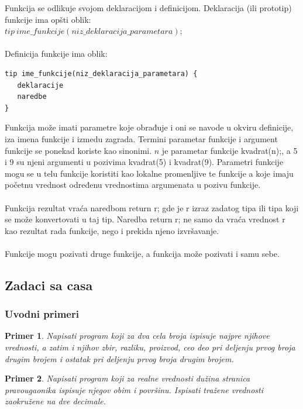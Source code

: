 \documentclass[a4paper]{article}
\newtheorem{primer}{Primer}[section]
\begin{document}
Funkcija se odlikuje svojom deklaracijom i definicijom.
Deklaracija (ili prototip) funkcije ima opšti oblik:\\
$tip\ ime\_funkcije(niz\_deklaracija\_parametara);$\\\\
Definicija funkcije ima oblik:
\begin{verbatim}
tip ime_funkcije(niz_deklaracija_parametara) {
   deklaracije
   naredbe
}
\end{verbatim}

Funkcija može imati parametre koje obrađuje i oni se navode u
okviru definicije, iza imena funkcije i izmedu zagrada.
Termini parametar funkcije i argument funkcije se ponekad
koriste kao sinonimi.
$n$ je parametar funkcije kvadrat(n);, a 5 i 9 su
njeni argumenti u pozivima kvadrat(5) i kvadrat(9).
Parametri funkcije mogu se u telu funkcije koristiti kao lokalne
promenljive te funkcije a koje imaju početnu vrednost
određenu vrednostima argumenata u pozivu funkcije.\\\\
Funkcija rezultat vraća naredbom return r; gde je r izraz
zadatog tipa ili tipa koji se može konvertovati u taj tip.
Naredba return r; ne samo da vraća vrednost r kao rezultat
rada funkcije, nego i prekida njeno izvršavanje.\\\\
Funkcije mogu pozivati druge funkcije, a funkcija može pozivati i samu sebe.

\subsection{Zadaci sa casa}
\subsubsection{Uvodni primeri}

\begin{primer}
Napisati program koji za dva cela broja ispisuje najpre
njihove vrednosti, a zatim i njihov zbir, razliku, proizvod, ceo deo pri deljenju
prvog broja drugim brojem i ostatak pri deljenju prvog broja drugim brojem. 
\end{primer}


\begin{primer}
Napisati program koji za realne vrednosti dužina
stranica pravougaonika ispisuje njegov obim i površinu. Ispisati tražene vrednosti
zaokružene na dve decimale. 
\end{primer}
\end{document}
